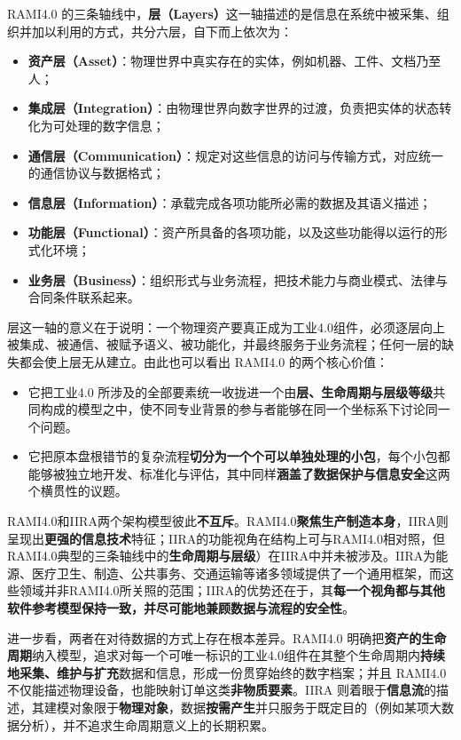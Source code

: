 RAMI4.0 的三条轴线中，\textbf{层（Layers）}这一轴描述的是信息在系统中被采集、组织并加以利用的方式，共分六层，自下而上依次为：
\begin{itemize}
  \item \textbf{资产层（Asset）}：物理世界中真实存在的实体，例如机器、工件、文档乃至人；
  \item \textbf{集成层（Integration）}：由物理世界向数字世界的过渡，负责把实体的状态转化为可处理的数字信息；
  \item \textbf{通信层（Communication）}：规定对这些信息的访问与传输方式，对应统一的通信协议与数据格式；
  \item \textbf{信息层（Information）}：承载完成各项功能所必需的数据及其语义描述；
  \item \textbf{功能层（Functional）}：资产所具备的各项功能，以及这些功能得以运行的形式化环境；
  \item \textbf{业务层（Business）}：组织形式与业务流程，把技术能力与商业模式、法律与合同条件联系起来。
\end{itemize}
层这一轴的意义在于说明：一个物理资产要真正成为工业4.0组件，必须逐层向上被集成、被通信、被赋予语义、被功能化，并最终服务于业务流程；任何一层的缺失都会使上层无从建立。由此也可以看出 RAMI4.0 的两个核心价值：
\begin{itemize}
  \item 它把工业4.0 所涉及的全部要素统一收拢进一个由\textbf{层、生命周期与层级等级}共同构成的模型之中，使不同专业背景的参与者能够在同一个坐标系下讨论同一个问题。
  \item 它把原本盘根错节的复杂流程\textbf{切分为一个个可以单独处理的小包}，每个小包都能够被独立地开发、标准化与评估，其中同样\textbf{涵盖了数据保护与信息安全}这两个横贯性的议题。
\end{itemize}

RAMI4.0和IIRA两个架构模型彼此\textbf{不互斥}。RAMI4.0\textbf{聚焦生产制造本身}，IIRA则呈现出\textbf{更强的信息技术}特征；IIRA的功能视角在结构上可与RAMI4.0相对照，但RAMI4.0典型的三条轴线中的\textbf{生命周期与层级}）在IIRA中并未被涉及。IIRA为能源、医疗卫生、制造、公共事务、交通运输等诸多领域提供了一个通用框架，而这些领域并非RAMI4.0所关照的范围；IIRA的优势还在于，其\textbf{每一个视角都与其他软件参考模型保持一致，并尽可能地兼顾数据与流程的安全性}。

进一步看，两者在对待数据的方式上存在根本差异。RAMI4.0 明确把\textbf{资产的生命周期}纳入模型，追求对每一个可唯一标识的工业4.0组件在其整个生命周期内\textbf{持续地采集、维护与扩充}数据和信息，形成一份贯穿始终的数字档案；并且 RAMI4.0 不仅能描述物理设备，也能映射订单这类\textbf{非物质要素}。IIRA 则着眼于\textbf{信息流}的描述，其建模对象限于\textbf{物理对象}，数据\textbf{按需产生}并只服务于既定目的（例如某项大数据分析），并不追求生命周期意义上的长期积累。

